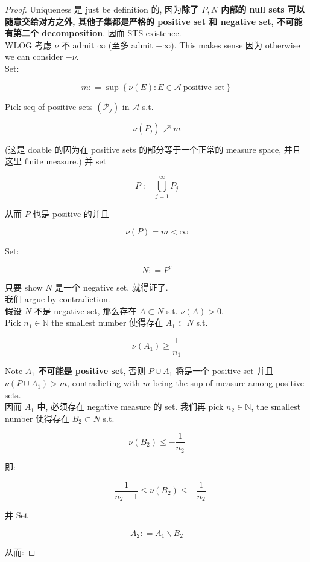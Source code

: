 \documentclass{qlnotes-export}
\begin{document}
\begin{proof}

Uniqueness 是 just be definition 的, 因为\textbf{除了 \(P,N\) 内部的 null sets 可以随意交给对方之外, 其他子集都是严格的 positive set 和 negative set, 不可能有第二个 decomposition}. 因而 STS existence.\\
WLOG 考虑 \(\nu\) 不 admit \(\infty\) (至多 admit \(- \infty\)). This makes sense 因为 otherwise we can consider \(- \nu\).\\
Set:

\[m: = \sup\left\{ {\nu(E):E \in \mathcal{A}\ \text{positive set}} \right\}\]

Pick seq of positive sets \((\mathcal{P}_{j})\) in \(\mathcal{A}\) s.t.

\[\nu(P_{j})\operatorname{\nearrow ︎}m\]

(这是 doable 的因为在 positive sets 的部分等于一个正常的 measure space, 并且这里 finite measure.) 并 set

\[P := \bigcup\limits_{j = 1}^{\infty}P_{j}\]

从而 \(P\) 也是 positive 的并且

\[\nu(P) = m < \infty\]

Set:

\[N: = P^{c}\]

只要 show \(N\) 是一个 negative set, 就得证了.\\
我们 argue by contradiction.\\
假设 \(N\) 不是 negative set, 那么存在 \(A \subset N\) s.t. \(\nu(A) > 0\).\\
Pick \(n_{1} \in {\mathbb{N}}\) the smallest number 使得存在 \(A_{1} \subset N\) s.t.

\[\nu(A_{1}) \geq \frac{1}{n_{1}}\]

Note \textbf{\(A_{1}\) 不可能是 positive set}, 否则 \(P \cup A_{1}\) 将是一个 positive set 并且 \(\nu(P \cup A_{1}) > m\), contradicting with \(m\) being the sup of measure among positive sets.\\
因而 \(A_{1}\) 中, 必须存在 negative measure 的 set. 我们再 pick \(n_{2} \in {\mathbb{N}}\), the smallest number 使得存在 \(B_{2} \subset N\) s.t.

\[\nu(B_{2}) \leq - \frac{1}{n_{2}}\]

即:

\[- \frac{1}{n_{2} - 1} \leq \nu(B_{2}) \leq - \frac{1}{n_{2}}\]

并 Set

\[A_{2}: = A_{1}\backslash B_{2}\]

从而:


\end{proof}
\end{document}
